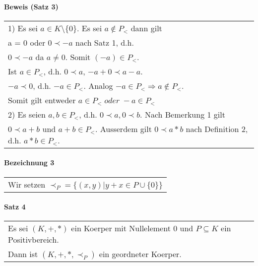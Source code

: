 \documentclass{scrartcl}
\begin{document}
\paragraph{Beweis (Satz 3)}
\begin{tabbing}
\begin{tabular}{l}
1) Es sei $a\in K\setminus \{ 0\}$. Es sei $a \notin P_<$ dann gilt\\
a = 0 oder $0 \prec -a$ nach Satz 1, d.h.\\
$0 \prec -a$ da $a \neq 0$. Somit $(-a) \in P_<$.\\
Ist $a\in P_<$, d.h. $0\prec a$, $-a+0 \prec a-a$.\\
$-a \prec 0$, d.h. $-a\in P_<$. Analog $-a\in P_< \Rightarrow a \notin P_<$.\\
Somit gilt entweder $a\in P_< \; oder \; -a\in P_<$\\
2) Es seien $a,b\in P_<$, d.h. $0 \prec a, 0\prec b$. Nach Bemerkung 1 gilt\\
$0 \prec a+b$ und $a+b\in P_<$. Ausserdem gilt $0\prec a*b$ nach Definition 2, d.h. $a*b\in P_<.$
\end{tabular}
\end{tabbing}

\paragraph{Bezeichnung 3}
\begin{tabbing}
\begin{tabular}{l}
Wir setzen $\prec_P = \{ (x,y)| y+x\in P\cup\{ 0\} \}$
\end{tabular}
\end{tabbing}

\paragraph{Satz 4}
\begin{tabbing}
\begin{tabular}{l}
Es sei $(K,+,*)$ ein Koerper mit Nullelement 0 und $P \subseteq K$ ein Positivbereich.\\
Dann ist $(K,+,*,\prec_P)$ ein geordneter Koerper.
\end{tabular}
\end{tabbing}
\end{document}

